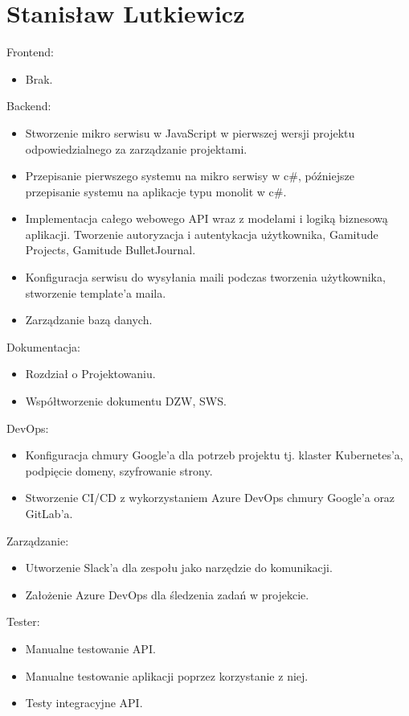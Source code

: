 \documentclass[a4paper,11pt]{report}
\begin{document}
\section {Stanisław Lutkiewicz}
Frontend:
\begin{itemize}
	\item Brak.
\end{itemize}
Backend:
\begin{itemize}
	\item Stworzenie mikro serwisu w JavaScript w pierwszej wersji projektu odpowiedzialnego za zarządzanie projektami. 
	\item Przepisanie pierwszego systemu na mikro serwisy w c\#, późniejsze przepisanie systemu na aplikacje typu monolit w c\#.
	\item Implementacja całego webowego API wraz z modelami i logiką biznesową aplikacji.
	Tworzenie autoryzacja i autentykacja użytkownika, Gamitude Projects, Gamitude BulletJournal.
	\item Konfiguracja serwisu do wysyłania maili podczas tworzenia użytkownika, stworzenie template'a maila.
	\item Zarządzanie bazą danych.
\end{itemize}
Dokumentacja:
\begin{itemize}
	\item Rozdział o Projektowaniu.
	\item Współtworzenie dokumentu DZW, SWS.
\end{itemize}
DevOps:
\begin{itemize}
	\item Konfiguracja chmury Google'a dla potrzeb projektu tj. klaster Kubernetes'a, podpięcie domeny, szyfrowanie strony.
	\item Stworzenie CI/CD z wykorzystaniem Azure DevOps chmury Google'a oraz GitLab'a. 
\end{itemize}
Zarządzanie:
\begin{itemize}
	\item Utworzenie Slack'a dla zespołu jako narzędzie do komunikacji.
	\item Założenie Azure DevOps dla śledzenia zadań w projekcie.
\end{itemize}
Tester:
\begin{itemize}
	\item Manualne testowanie API.
	\item Manualne testowanie aplikacji poprzez korzystanie z niej.
	\item Testy integracyjne API.
\end{itemize}
\end{document}
